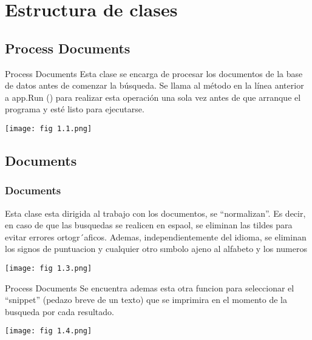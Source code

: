 \section{Estructura de clases}

\subsection{Process Documents}
\begin{frame}{Process Documents}
    Esta clase se encarga de procesar los documentos de la base de datos antes de comenzar la búsqueda.
    Se llama al método en la línea anterior a app.Run () para realizar esta operación una sola vez antes de que
    arranque el programa y esté listo para ejecutarse.

\pause

    \begin{center}
        \texttt{[image: fig 1.1.png]}\\
    \end{center}
\end{frame}  

\subsection{Documents}

\begin{frame}
    \frametitle{Documents}
    Esta clase esta dirigida al trabajo con los documentos, se “normalizan”. Es decir, en caso de que las
busquedas se realicen en espaol, se eliminan las tildes para evitar errores ortogr´aficos. Ademas, independientemente del idioma, se eliminan los signos de puntuacion y cualquier otro sımbolo ajeno al alfabeto 
y los numeros

\pause

\begin{center}
	\texttt{[image: fig 1.3.png]}\\
\end{center}
\end{frame}

\begin{frame}{Process Documents}
    Se encuentra ademas esta otra funcion para seleccionar el “snippet” (pedazo breve de un texto) que se 
    imprimira en el momento de la busqueda por cada resultado.

\pause

\begin{center}
	\texttt{[image: fig 1.4.png]}\\
\end{center}
\end{frame}


